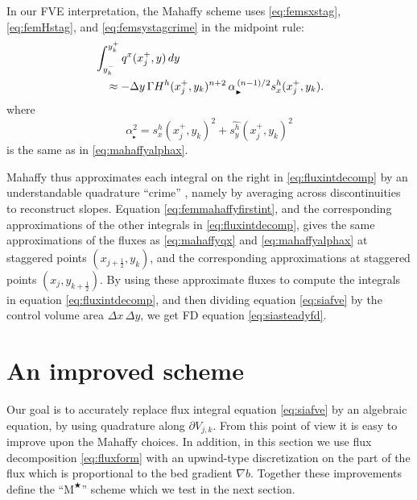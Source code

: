 \documentclass[twocolumn,letterpaper]{igs}
\newcommand{\grad}{\nabla}
\newcommand{\Mstar}{$\text{M}^{\bigstar}$\xspace}
\newcommand\alpharight{\alpha_{{}_{\blacktriangleright}}}
\newcommand{\half}{\tfrac{1}{2}}
\begin{document}
In our FVE interpretation, the Mahaffy scheme uses \eqref{eq:femsxstag}, \eqref{eq:femHstag}, and \eqref{eq:femsystagcrime} in the midpoint rule:
\begin{align}
&\int_{y_k^-}^{y_k^+} q^x(x_j^+,y)\,dy  \label{eq:femmahaffyfirstint} \\
  &\quad\approx - \Delta y\, \Gamma H^h(x_j^+,y_k)^{n+2} \,\alpharight^{\,(n-1)/2} s^h_x(x_j^+,y_k). \notag 
\end{align}
where
\begin{equation}
\alpharight^2 = s^h_x(x_j^+,y_k)^2 + \widehat{s^h_y}(x_j^+,y_k)^2
\end{equation}
is the same as in \eqref{eq:mahaffyalphax}.

Mahaffy thus approximates each integral on the right in \eqref{eq:fluxintdecomp} by an understandable quadrature ``crime'' \citep[compare][]{Strang1972}, namely by averaging across discontinuities to reconstruct slopes.  Equation \eqref{eq:femmahaffyfirstint}, and the corresponding approximations of the other integrals in \eqref{eq:fluxintdecomp}, gives the same approximations of the fluxes as \eqref{eq:mahaffyqx} and \eqref{eq:mahaffyalphax} at staggered points $(x_{j+\half},y_k)$, and the corresponding approximations at staggered points $(x_j,y_{k+\half})$.  By using these approximate fluxes to compute the integrals in equation \eqref{eq:fluxintdecomp}, and then dividing equation \eqref{eq:siafve} by the control volume area $\Delta x\,\Delta y$, we get FD equation \eqref{eq:siasteadyfd}.


\section{An improved scheme}  \label{sec:star}

Our goal is to accurately replace flux integral equation \eqref{eq:siafve} by an algebraic equation, by using quadrature along $\partial V_{j,k}$.  From this point of view it is easy to improve upon the Mahaffy choices.  In addition, in this section we use flux decomposition \eqref{eq:fluxform} with an upwind-type discretization on the part of the flux which is proportional to the bed gradient $\grad b$.  Together these improvements define the ``\Mstar'' scheme which we test in the next section.
\end{document}
